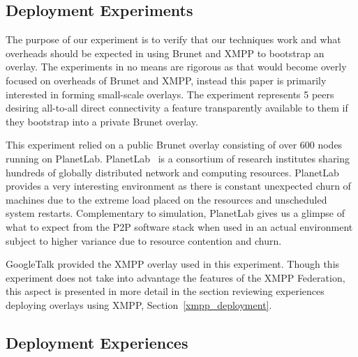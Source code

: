 \documentclass[conference]{IEEEtran}
\begin{document}
\subsection{Deployment Experiments}

The purpose of our experiment is to verify that our techniques work and what
overheads should be expected in using Brunet and XMPP to bootstrap an overlay.
The experiments in no means are rigorous as that would become overly focused on
overheads of Brunet and XMPP, instead this paper is primarily interested in
forming small-scale overlays.  The experiment represents 5 peers desiring
all-to-all direct connectivity a feature transparently available to them if
they bootstrap into a private Brunet overlay.

This experiment relied on a public Brunet overlay consisting of over 600 nodes
running on PlanetLab.  PlanetLab~\cite{planetlab} is a consortium of research
institutes sharing hundreds of globally distributed network and computing
resources.  PlanetLab provides a very interesting environment as there is
constant unexpected churn of machines due to the extreme load placed on the
resources and unscheduled system restarts.  Complementary to simulation,
PlanetLab gives us a glimpse of what to expect from the P2P software stack when
used in an actual environment subject to higher variance due to resource
contention and churn.

GoogleTalk provided the XMPP overlay used in this experiment.  Though this
experiment does not take into advantage the features of the XMPP Federation,
this aspect is presented in more detail in the section reviewing experiences
deploying overlays using XMPP, Section~\ref{xmpp_deployment}.

\subsection{Deployment Experiences}
\end{document}
